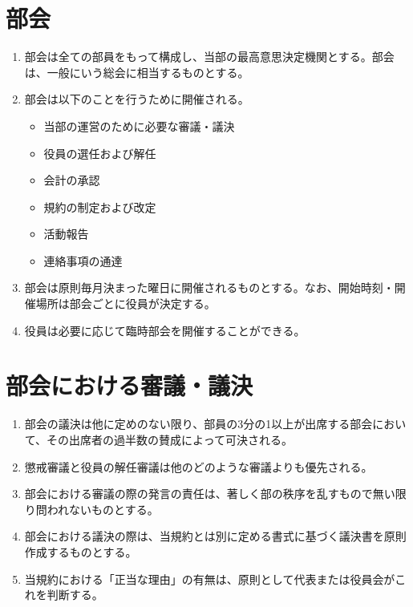 \documentclass[12pt, unicode, a4paper]{ltjsreport}
\begin{document}
    \section{部会}\label{meeting}
        \begin{enumerate}
            \item 部会は全ての部員をもって構成し、当部の最高意思決定機関とする。部会は、一般にいう総会に相当するものとする。
            \item 部会は以下のことを行うために開催される。
            \begin{itemize}
                \item 当部の運営のために必要な審議・議決
                \item 役員の選任および解任
                \item 会計の承認
                \item 規約の制定および改定
                \item 活動報告
                \item 連絡事項の通達
            \end{itemize}
            \item 部会は原則毎月決まった曜日に開催されるものとする。なお、開始時刻・開催場所は部会ごとに役員が決定する。
            \item 役員は必要に応じて臨時部会を開催することができる。
        \end{enumerate}

    \section{部会における審議・議決}\label{decision}
        \begin{enumerate}
            \item 部会の議決は他に定めのない限り、部員の3分の1以上が出席する部会において、その出席者の過半数の賛成によって可決される。
            \item 懲戒審議と役員の解任審議は他のどのような審議よりも優先される。
            \item 部会における審議の際の発言の責任は、著しく部の秩序を乱すもので無い限り問われないものとする。
            \item 部会における議決の際は、当規約とは別に定める書式に基づく議決書を原則作成するものとする。
            \item 当規約における「正当な理由」の有無は、原則として代表または役員会がこれを判断する。
        \end{enumerate}
\end{document}
